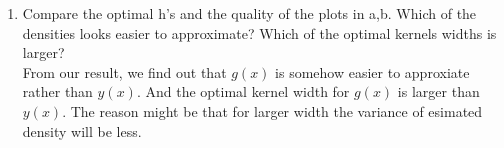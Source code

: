 \documentclass[preprint,12pt]{elsarticle}
\begin{document}
\begin{enumerate}[label=\alph*]
\begin{figure}[htbp!]
\begin{subfigure}{0.8\textwidth}
                \caption{$g_h^{*}(x)$ with real $g(x)$ at $h^{*} = 0.02$}
                \label{fig:52}
            \end{subfigure}
            \caption{The plot shows that the kernel density at $h^{*}$ is 
            pretty close to the real $g(x)$, even better than what we have
            for $f(x)$.}
            \label{fig:5}
        \end{figure}
        The plot is Figure\ref{fig:5} and the $h^{*}$ we have for $g(x)$ is 
        \begin{spverbatim}
>>> h[np.where(Lv==max(Lv))[0][0]]
0.02
        \end{spverbatim}

        \item Compare the optimal h's and the quality of the plots in a,b. Which 
        of the densities looks easier to approximate? Which of the optimal kernels 
        widths is larger?\\
        
        From our result, we find out that $g(x)$ is somehow easier to approxiate 
        rather than $y(x)$. And the optimal kernel width for $g(x)$ is larger than 
        $y(x)$. The reason might be that for larger width the variance of esimated
        density will be less.

    \end{enumerate}
\end{document}
